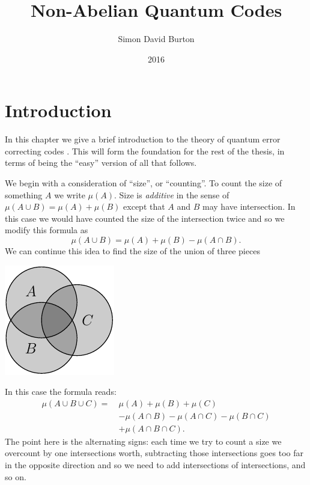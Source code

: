 \documentclass[11pt,twoside,openright]{report}
\title{Non-Abelian Quantum Codes}
\author{Simon David Burton}
\date{2016}
\def\euler{\mu}
\begin{document}
\maketitle


\declaration


\tableofcontents

\chapter{Introduction}

%

In this chapter we give a brief introduction to
the theory of quantum error correcting codes \cite{Calderbank1997,Dennis2002}.
This will form the foundation for the rest of the thesis,
in terms of being the ``easy'' version of all that follows.

We begin with a consideration of ``size'', or ``counting''.
To count the size of something $A$ we write $\euler(A).$
Size is \emph{additive} in the sense of 
$\euler(A\cup B) = \euler(A) + \euler(B)$ except that
$A$ and $B$ may have intersection.
In this case we would have counted the 
size of the intersection twice and so we modify this formula as
$$
    \euler(A\cup B) = \euler(A) + \euler(B) - \euler(A\cap B).
$$
We can continue this idea to find the
size of the union of three pieces
\begin{center}
\includegraphics{pic-ABC.pdf}
\end{center}
In this case the formula reads:
\begin{align}\label{EulerAddSub}
\euler(A\cup B\cup C) = \ &\euler(A) + \euler(B) + \euler(C)  \nonumber \\
                     &- \euler(A\cap B) - \euler(A\cap C) - \euler(B\cap C) \nonumber \\
                     &+ \euler(A\cap B \cap C).
\end{align}
The point here is the alternating signs:
each time we try to count a size we overcount by
one intersections worth, subtracting those intersections
goes too far in the opposite direction and so we need
to add intersections of intersections, and so on.
\end{document}
